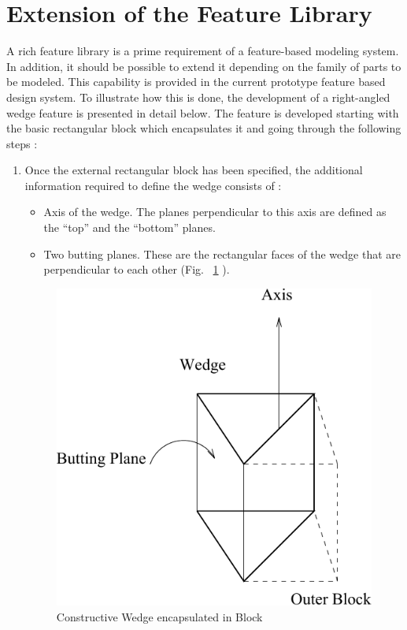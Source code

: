 	\section{Extension of the Feature Library}

		A rich feature library is a prime requirement of a feature-based 
		modeling
	system. In addition, it should be possible to extend it depending
	on the family of parts to be modeled. This capability is provided
	in the current prototype feature based design system. To illustrate how 
	this is done, the development of a right-angled wedge feature is presented 
	in detail below. The feature is developed starting with the basic 
	rectangular block which encapsulates it and going through the following 
	steps :
	\begin{enumerate}
	\item
	Once the external rectangular block has been specified, the additional 
	information required to define the wedge consists of :

		\begin{itemize}
		\item
		Axis of the wedge. The planes perpendicular to this axis
		are defined as the ``top'' and the ``bottom'' planes.
		\item
		Two butting planes. These are the rectangular faces of the wedge that
		are perpendicular to each other (Fig. ~\ref{wedblk}	).
		\end{itemize}

		\begin{figure}[htbp]
		\includegraphics[scale=1.2]{WEDBLK.pdf}
	            \caption{Constructive Wedge encapsulated in Block}
	            \label{wedblk}
  		\end{figure}


\end{enumerate}
